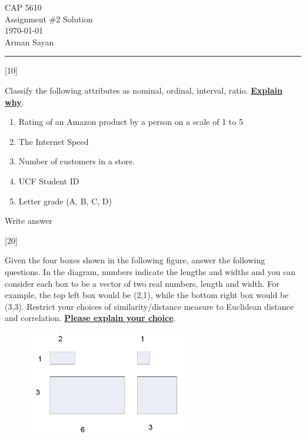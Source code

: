 \documentclass[12pt,letterpaper, onecolumn]{exam}
\begin{document}
\begingroup  
    \centering
    \LARGE CAP 5610\\
    \LARGE Assignment \#2 Solution\\[0.5em]
    \large \today\\[0.5em]
    \large Arman Sayan\par
\endgroup
\rule{\textwidth}{0.4pt}
\bracketedpoints   %
\printanswers
\renewcommand{\solutiontitle}{\noindent\textbf{Ans:}\enspace}   %
\qformat{\large \textbf{\thequestion \quad \thequestiontitle \quad [\thepoints] \hfill}}
\renewcommand{\thepartno}{\arabic{partno}}
\renewcommand{\partlabel}{\thepartno.}

\begin{questions}
    [10]
    
    Classify the following attributes as nominal, ordinal, interval, ratio. \textbf{\underline{Explain why}}.

    \begin{enumerate}[label=(\alph*)]
        \item Rating of an Amazon product by a person on a scale of 1 to 5
        \item The Internet Speed
        \item Number of customers in a store.
        \item UCF Student ID
        \item Letter grade (A, B, C, D)
    \end{enumerate}
    
    \begin{solution}
        Write answer
    \end{solution}

    \pagebreak

    [20]

    Given the four boxes shown in the following figure, answer the following questions. In the 
    diagram, numbers indicate the lengths and widths and you can consider each box to be a vector 
    of two real numbers, length and width. For example, the top left box would be (2,1), while the 
    bottom right box would be (3,3). Restrict your choices of similarity/distance measure to 
    Euclidean distance and correlation. \textbf{\underline{Please explain your choice}}.

    \begin{figure}[h]
        \centering
        \includegraphics[width=0.65\textwidth]{boxes.png}
    \end{figure}


\end{questions}
\end{document}
